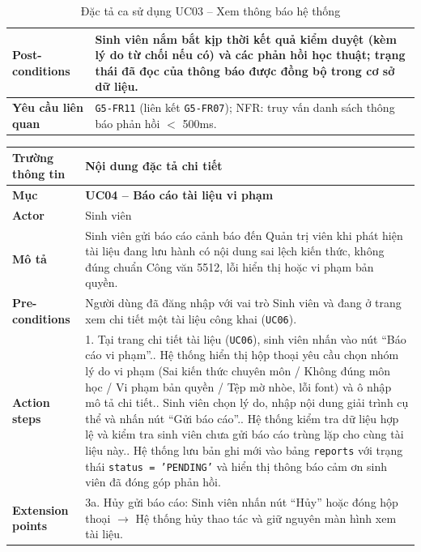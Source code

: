 \begin{table}[H]
\begin{tabularx}{\textwidth}{|p{3.5cm}|X|}
\hline
\textbf{Post-conditions} & Sinh viên nắm bắt kịp thời kết quả kiểm duyệt (kèm lý do từ chối nếu có) và các phản hồi học thuật; trạng thái đã đọc của thông báo được đồng bộ trong cơ sở dữ liệu. \\
\hline
\textbf{Yêu cầu liên quan} & \texttt{G5-FR11} (liên kết \texttt{G5-FR07}); NFR: truy vấn danh sách thông báo phản hồi $<$ 500ms. \\
\hline
\end{tabularx}
\caption{Đặc tả ca sử dụng UC03 -- Xem thông báo hệ thống}
\label{tab:uc03}
\end{table}


\begin{table}[H]
\centering
\footnotesize\linespread{1.05}\selectfont
\setlength{\tabcolsep}{5pt}
\renewcommand{\arraystretch}{1.12}
\begin{tabularx}{\textwidth}{|p{3.5cm}|X|}
\hline
\rowcolor[HTML]{EAEAEA}
\textbf{Trường thông tin} & \textbf{Nội dung đặc tả chi tiết} \\
\hline
\textbf{Mục} & \textbf{UC04 -- Báo cáo tài liệu vi phạm} \\
\hline
\textbf{Actor} & Sinh viên \\
\hline
\textbf{Mô tả} & Sinh viên gửi báo cáo cảnh báo đến Quản trị viên khi phát hiện tài liệu đang lưu hành có nội dung sai lệch kiến thức, không đúng chuẩn Công văn 5512, lỗi hiển thị hoặc vi phạm bản quyền. \\
\hline
\textbf{Pre-conditions} & Người dùng đã đăng nhập với vai trò Sinh viên và đang ở trang xem chi tiết một tài liệu công khai (\texttt{UC06}). \\
\hline
\textbf{Action steps} & 1. Tại trang chi tiết tài liệu (\texttt{UC06}), sinh viên nhấn vào nút ``Báo cáo vi phạm''.\newline 2. Hệ thống hiển thị hộp thoại yêu cầu chọn nhóm lý do vi phạm (Sai kiến thức chuyên môn / Không đúng môn học / Vi phạm bản quyền / Tệp mờ nhòe, lỗi font) và ô nhập mô tả chi tiết.\newline 3. Sinh viên chọn lý do, nhập nội dung giải trình cụ thể và nhấn nút ``Gửi báo cáo''.\newline 4. Hệ thống kiểm tra dữ liệu hợp lệ và kiểm tra sinh viên chưa gửi báo cáo trùng lặp cho cùng tài liệu này.\newline 5. Hệ thống lưu bản ghi mới vào bảng \texttt{reports} với trạng thái \texttt{status = 'PENDING'} và hiển thị thông báo cảm ơn sinh viên đã đóng góp phản hồi. \\
\hline
\textbf{Extension points} & 3a. Hủy gửi báo cáo: Sinh viên nhấn nút ``Hủy'' hoặc đóng hộp thoại $\rightarrow$ Hệ thống hủy thao tác và giữ nguyên màn hình xem tài liệu. \\

\end{tabularx}
\end{table}
